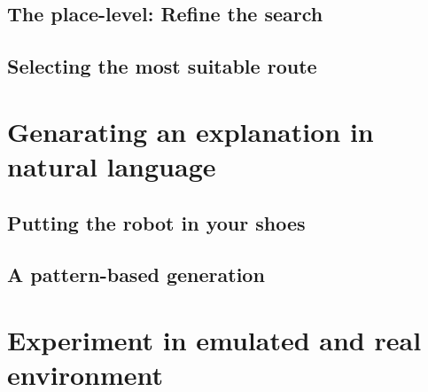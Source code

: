 \subsection{The place-level: Refine the search}

\subsection{Selecting the most suitable route}

\section{Genarating an explanation in natural language}

\subsection{Putting the robot in your shoes}

\subsection{A pattern-based generation}

\section{Experiment in emulated and real environment}




